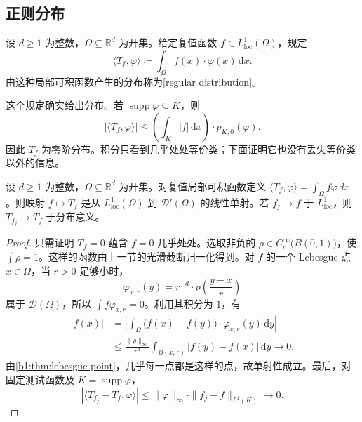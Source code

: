 \subsection{正则分布}
\label{b1:subsec:200202}

\begin{definition}\label{b1:def:regular-distribution}
设 \(d\geq1\) 为整数，\(\Omega\subseteq\mathbb R^d\) 为开集。给定复值函数 \(f\in L^1_{\mathrm{loc}}(\Omega)\)，规定
\[
 \langle T_f,\varphi\rangle
 \coloneqq\int_\Omega f(x)\cdot\varphi(x)\,\mathrm dx.
\]
由这种局部可积函数产生的分布称为[regular distribution]。
\end{definition}

这个规定确实给出分布。若 \(\operatorname{supp}\varphi\subseteq K\)，则
\[
 |\langle T_f,\varphi\rangle|
 \leq\left(\int_K|f|\,\mathrm dx\right)\cdot p_{K,0}(\varphi).
\]
因此 \(T_f\) 为零阶分布。积分只看到几乎处处等价类；下面证明它也没有丢失等价类以外的信息。

\begin{proposition}\label{b1:prop:regular-distribution-injective}
设 \(d\geq1\) 为整数，\(\Omega\subseteq\mathbb R^d\) 为开集。对复值局部可积函数定义 \(\langle T_f,\varphi\rangle=\int_\Omega f\varphi\,dx\)。则映射 \(f\mapsto T_f\) 是从 \(L^1_{\mathrm{loc}}(\Omega)\) 到 \(\mathcal D'(\Omega)\) 的线性单射。若 \(f_j\rightarrow f\) 于 \(L^1_{\mathrm{loc}}\)，则 \(T_{f_j}\rightarrow T_f\) 于分布意义。
\end{proposition}
\begin{proof}
只需证明 \(T_f=0\) 蕴含 \(f=0\) 几乎处处。选取非负的 \(\rho\in C_c^\infty\bigl(B(0,1)\bigr)\)，使 \(\int\rho=1\)。这样的函数由上一节的光滑截断归一化得到。对 \(f\) 的一个 Lebesgue 点 \(x\in\Omega\)，当 \(r>0\) 足够小时，
\[
 \varphi_{x,r}(y)=r^{-d}\cdot \rho\left(\frac{y-x}r\right)
\]
属于 \(\mathcal D(\Omega)\)，所以 \(\int f\varphi_{x,r}=0\)。利用其积分为 \(1\)，有
\[
 \begin{aligned}
 |f(x)|
 &=\left|\int_\Omega\bigl(f(x)-f(y)\bigr)\cdot\varphi_{x,r}(y)\,\mathrm dy\right|\\
 &\leq\frac{\|\rho\|_\infty}{r^d}
        \int_{B(x,r)}|f(y)-f(x)|\,\mathrm dy
 \longrightarrow0.
 \end{aligned}
\]
由\cref{b1:thm:lebesgue-point}，几乎每一点都是这样的点，故单射性成立。最后，对固定测试函数及 \(K=\operatorname{supp}\varphi\)，
\[
 |\langle T_{f_j}-T_f,\varphi\rangle|
 \leq\|\varphi\|_\infty\cdot\|f_j-f\|_{L^1(K)}
 \longrightarrow0.
\]
\end{proof}

